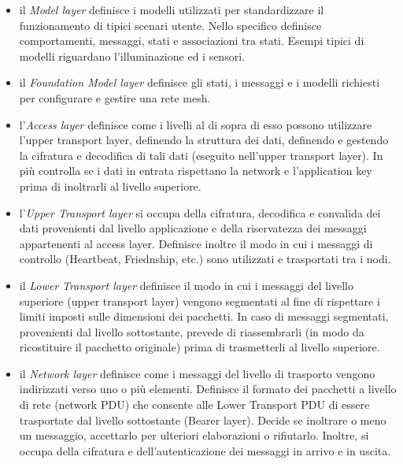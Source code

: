\begin{itemize}
    \item il \textit{Model layer} definisce i modelli utilizzati per standardizzare il funzionamento di tipici scenari utente. Nello specifico definisce comportamenti, messaggi, stati e associazioni tra stati. Esempi tipici di modelli riguardano l'illuminazione ed i sensori.
    
    \item il \textit{Foundation Model layer} definisce gli stati, i messaggi e i modelli richiesti per configurare e gestire una rete mesh.
    
    \item l'\textit{Access layer} definisce come i livelli al di sopra di esso possono utilizzare l'upper transport layer, definendo la struttura dei dati, definendo e gestendo la cifratura e decodifica di tali dati (eseguito nell'upper transport layer). In più controlla se i dati in entrata rispettano la network e l'application key prima di inoltrarli al livello superiore.
    
    \item l'\textit{Upper Transport layer} si occupa della cifratura, decodifica e convalida dei dati provenienti dal livello applicazione e della riservatezza dei messaggi appartenenti al access layer. Definisce inoltre il modo in cui i messaggi di controllo (Heartbeat, Friednship, etc.) sono utilizzati e trasportati tra i nodi.
    
    \item il \textit{Lower Transport layer} definisce il modo in cui i messaggi del livello superiore (upper transport layer) vengono segmentati al fine di rispettare i limiti imposti sulle dimensioni dei pacchetti. In caso di messaggi segmentati, provenienti dal livello sottostante, prevede di riassembrarli (in modo da ricostituire il pacchetto originale) prima di trasmetterli al livello superiore.
    
    \item il \textit{Network layer} definisce come i messaggi del livello di trasporto vengono indirizzati verso uno o più elementi. Definisce il formato dei pacchetti a livello di rete (network PDU) che consente alle Lower Transport PDU di essere trasportate dal livello sottostante (Bearer layer). Decide se inoltrare o meno un messaggio, accettarlo per ulteriori elaborazioni o rifiutarlo. Inoltre, si occupa della cifratura e dell'autenticazione dei messaggi in arrivo e in uscita.
    

\end{itemize}
